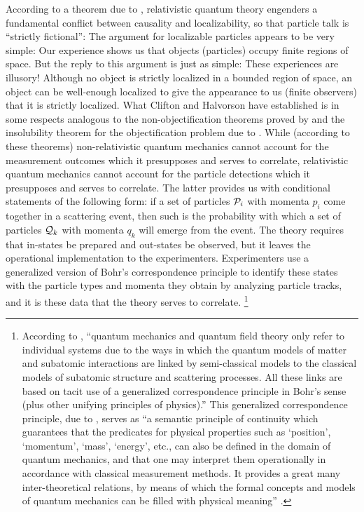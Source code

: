 According to a theorem due to \citet{CH}, relativistic quantum theory engenders a fundamental conflict between causality and localizability, so that particle talk is ``strictly fictional'': 
\bq
The argument for localizable particles appears to be very simple: Our experience shows us that objects (particles) occupy finite regions of space. But the reply to this argument is just as simple: These experiences are illusory! Although no object is strictly localized in a bounded region of space, an object can be well-enough localized to give the appearance to us (finite observers) that it is strictly localized.
\eq
What Clifton and Halvorson have established is in some respects analogous to the non-objectification theorems proved by \citet[Sect.~4.3(b)]{Mittelstaedt} and the insolubility theorem for the objectification problem due to \citet[Sect.~III.6.2]{Buschetal}. While (according to these theorems) non-relativistic quantum mechanics cannot account for the measurement outcomes which it presupposes and serves to correlate, relativistic quantum mechanics cannot account for the particle detections which it presupposes and serves to correlate. The latter provides us with conditional statements of the following form: if a set of particles ${\cal P}_i$ with momenta $p_i$ come together in a scattering event, then such is the probability with which a set of particles ${\cal Q}_k$ with momenta $q_k$ will emerge from the event. The theory requires that in-states be prepared and out-states be observed, but it leaves the operational implementation to the experimenters. Experimenters use a generalized version of Bohr's correspondence principle to identify these states with the particle types and momenta they obtain by analyzing particle tracks, and it is these data that the theory serves to correlate.%
\footnote{According to \citet[p. XII]{Falkenburg}, ``quantum mechanics and quantum field theory only refer to individual systems due to the ways in which the quantum models of matter and subatomic interactions are linked by semi-classical models to the classical models of subatomic structure and scattering processes. All these links are based on tacit use of a generalized correspondence principle in Bohr's sense (plus other unifying principles of physics).'' This generalized correspondence principle, due to \citet{Heisenberg}, serves as ``a semantic principle of continuity which guarantees that the predicates for physical properties such as `position', `momentum', `mass', `energy', etc., can also be defined in the domain of quantum mechanics, and that one may interpret them operationally in accordance with classical measurement methods. It provides a great many inter-theoretical relations, by means of which the formal concepts and models of quantum mechanics can be filled with physical meaning'' \citep[p.~191]{Falkenburg}.}

